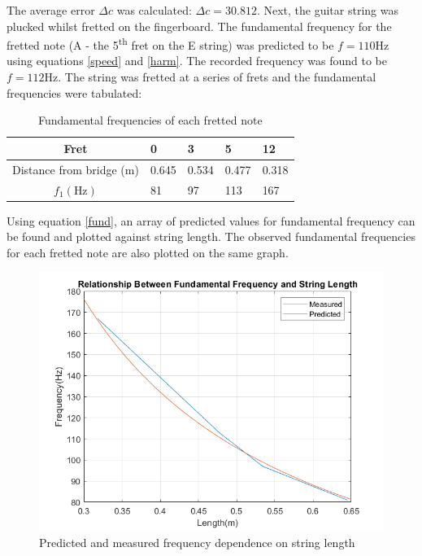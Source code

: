 \documentclass[11pt]{article}
\begin{document}
            The average error $\Delta c$ was calculated: $\Delta c = 30.812$.
            Next, the guitar string was plucked whilst fretted on the fingerboard.
            The fundamental frequency for the fretted note (A - the 5\textsuperscript{th} fret on the E string) was predicted to be $f=110\si{\hertz}$ using equations \ref{speed} and \ref{harm}.
            The recorded frequency was found to be $f=112\si{\hertz}$.
            The string was fretted at a series of frets and the fundamental frequencies were tabulated:
            \begin{table}[H]
                \centering
                \begin{tabular}{c | l l l l}
                    \hline
                    Fret & 0 & 3 & 5 & 12 \\
                    \hline
                    Distance from bridge (\si{\meter}) & 0.645 & 0.534 & 0.477 & 0.318 \\
                    \hline
                    $f_1(\si{\hertz})$ & 81 & 97 & 113 & 167 \\
                    \hline
                \end{tabular}
                \caption{Fundamental frequencies of each fretted note}
            \end{table}
            Using equation \ref{fund}, an array of predicted values for fundamental frequency can be found and plotted against string length.
            The observed fundamental frequencies for each fretted note are also plotted on the same graph.
            \begin{figure}[H]\label{f1vsl}
                \centering
                \includegraphics[scale=0.5]{resources/F1vsL.png}
                \caption{Predicted and measured frequency dependence on string length}
            \end{figure}
\end{document}
